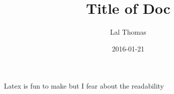 \documentclass{article}
\title{Title of Doc}
\date{2016-01-21}
\author{ Lal Thomas}
\begin{document}
\maketitle
\newpage
Latex is fun to make but I fear about the readability
\end{document}
